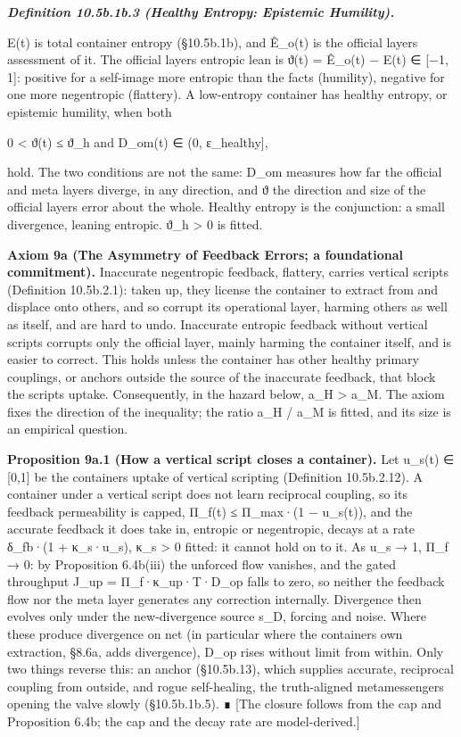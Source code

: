 \documentclass[
]{article}
\begin{document}
\emph{\textbf{Definition 10.5b.1b.3 (Healthy Entropy: Epistemic
Humility).}}

E(t) is total container entropy (§10.5b.1b), and Ê\_o(t) is the official
layer\textquotesingle s assessment of it. The official
layer\textquotesingle s entropic lean is ϑ(t) = Ê\_o(t) − E(t) ∈ {[}−1,
1{]}: positive for a self-image more entropic than the facts (humility),
negative for one more negentropic (flattery). A low-entropy container
has healthy entropy, or epistemic humility, when both

0 \textless{} ϑ(t) ≤ ϑ\_h and D\_om(t) ∈ (0, ε\_healthy{]},

hold. The two conditions are not the same: D\_om measures how far the
official and meta layers diverge, in any direction, and ϑ the direction
and size of the official layer\textquotesingle s error about the whole.
Healthy entropy is the conjunction: a small divergence, leaning
entropic. ϑ\_h \textgreater{} 0 is fitted.

\textbf{Axiom 9a (The Asymmetry of Feedback Errors; a foundational
commitment).} Inaccurate negentropic feedback, flattery, carries
vertical scripts (Definition 10.5b.2.1): taken up, they license the
container to extract from and displace onto others, and so corrupt its
operational layer, harming others as well as itself, and are hard to
undo. Inaccurate entropic feedback without vertical scripts corrupts
only the official layer, mainly harming the container itself, and is
easier to correct. This holds unless the container has other healthy
primary couplings, or anchors outside the source of the inaccurate
feedback, that block the script\textquotesingle s uptake. Consequently,
in the hazard below, a\_H \textgreater{} a\_M. The axiom fixes the
direction of the inequality; the ratio a\_H / a\_M is fitted, and its
size is an empirical question.

\textbf{Proposition 9a.1 (How a vertical script closes a container).}
Let u\_s(t) ∈ {[}0,1{]} be the container\textquotesingle s uptake of
vertical scripting (Definition 10.5b.2.12). A container under a vertical
script does not learn reciprocal coupling, so its feedback permeability
is capped, Π\_f(t) ≤ Π\_max·(1 − u\_s(t)), and the accurate feedback it
does take in, entropic or negentropic, decays at a rate δ\_fb·(1 +
κ\_s·u\_s), κ\_s \textgreater{} 0 fitted: it cannot hold on to it. As
u\_s → 1, Π\_f → 0: by Proposition 6.4b(iii) the unforced flow vanishes,
and the gated throughput J\_up = Π\_f·κ\_up·T·D\_op falls to zero, so
neither the feedback flow nor the meta layer generates any correction
internally. Divergence then evolves only under the new-divergence source
s\_D, forcing and noise. Where these produce divergence on net (in
particular where the container\textquotesingle s own extraction, §8.6a,
adds divergence), D\_op rises without limit from within. Only two things
reverse this: an anchor (§10.5b.13), which supplies accurate, reciprocal
coupling from outside, and rogue self-healing, the truth-aligned
metamessengers opening the valve slowly (§10.5b.1b.5). ∎ {[}The closure
follows from the cap and Proposition 6.4b; the cap and the decay rate
are model-derived.{]}
\end{document}

